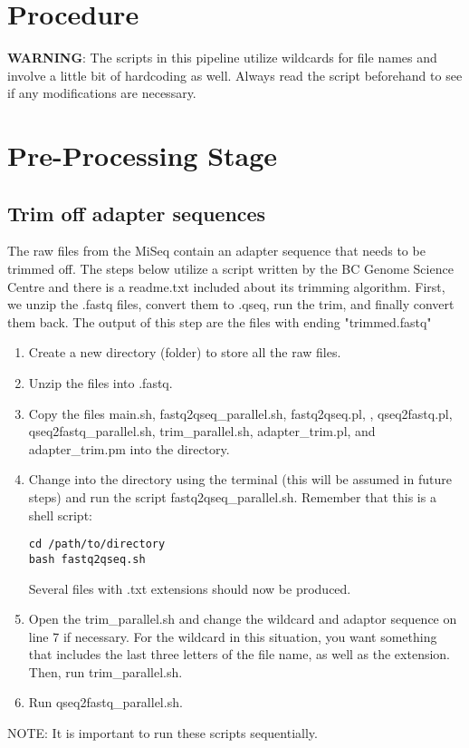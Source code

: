 \documentclass[12pt,titlepage]{article}
\begin{document}
\section*{Procedure}
\textbf{WARNING}: The scripts in this pipeline utilize wildcards for file names and involve a little bit of hardcoding as well. Always read the script beforehand to see if any modifications are necessary.  

\section{Pre-Processing Stage}

\subsection{Trim off adapter sequences}
The raw files from the MiSeq contain an adapter sequence that needs to be trimmed off. The steps below utilize a script written by the BC Genome Science Centre and there is a readme.txt included about its trimming algorithm. First, we unzip the .fastq files, convert them to .qseq, run the trim, and finally convert them back. The output of this step are the files with ending "trimmed.fastq"
\begin{enumerate}
\item Create a new directory (folder) to store all the raw files.
\item Unzip the files into .fastq.
\item Copy the files main.sh, fastq2qseq\_parallel.sh, fastq2qseq.pl, , qseq2fastq.pl, qseq2fastq\_parallel.sh, trim\_parallel.sh, adapter\_trim.pl, and adapter\_trim.pm  into the directory.
\item Change into the directory using the terminal (this will be assumed in future steps) and run the script fastq2qseq\_parallel.sh. Remember that this is a shell script:
\begin{tcolorbox}
\begin{lstlisting}
cd /path/to/directory
bash fastq2qseq.sh 
\end{lstlisting}
\end{tcolorbox}
Several files with .txt extensions should now be produced.
\item Open the trim\_parallel.sh and change the wildcard and adaptor sequence on line 7 if necessary. For the wildcard in this situation, you want something that includes the last three letters of the file name, as well as the extension. Then, run trim\_parallel.sh.
\item Run qseq2fastq\_parallel.sh.
\end{enumerate}
\noindent NOTE: It is important to run these scripts sequentially.
\end{document}
